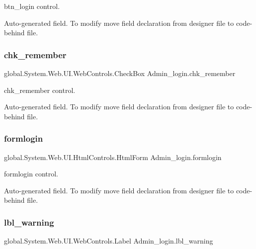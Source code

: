 btn\+\_\+login control. 

Auto-\/generated field. To modify move field declaration from designer file to code-\/behind file. \mbox{\label{class_admin__login_ae8bcce72339c8924b596ad8f7334e919}} 
\subsubsection{\texorpdfstring{chk\_remember}{chk\_remember}}
{\footnotesize\ttfamily global.\+System.\+Web.\+U\+I.\+Web\+Controls.\+Check\+Box Admin\+\_\+login.\+chk\+\_\+remember\hspace{0.3cm}{\ttfamily [protected]}}



chk\+\_\+remember control. 

Auto-\/generated field. To modify move field declaration from designer file to code-\/behind file. \mbox{\label{class_admin__login_a18ef99a7f1a60d6bfd2531684b7f1df4}} 
\subsubsection{\texorpdfstring{formlogin}{formlogin}}
{\footnotesize\ttfamily global.\+System.\+Web.\+U\+I.\+Html\+Controls.\+Html\+Form Admin\+\_\+login.\+formlogin\hspace{0.3cm}{\ttfamily [protected]}}



formlogin control. 

Auto-\/generated field. To modify move field declaration from designer file to code-\/behind file. \mbox{\label{class_admin__login_aee6b8294d8405197383b9d6aeabe06cc}} 
\subsubsection{\texorpdfstring{lbl\_warning}{lbl\_warning}}
{\footnotesize\ttfamily global.\+System.\+Web.\+U\+I.\+Web\+Controls.\+Label Admin\+\_\+login.\+lbl\+\_\+warning\hspace{0.3cm}{\ttfamily [protected]}}



